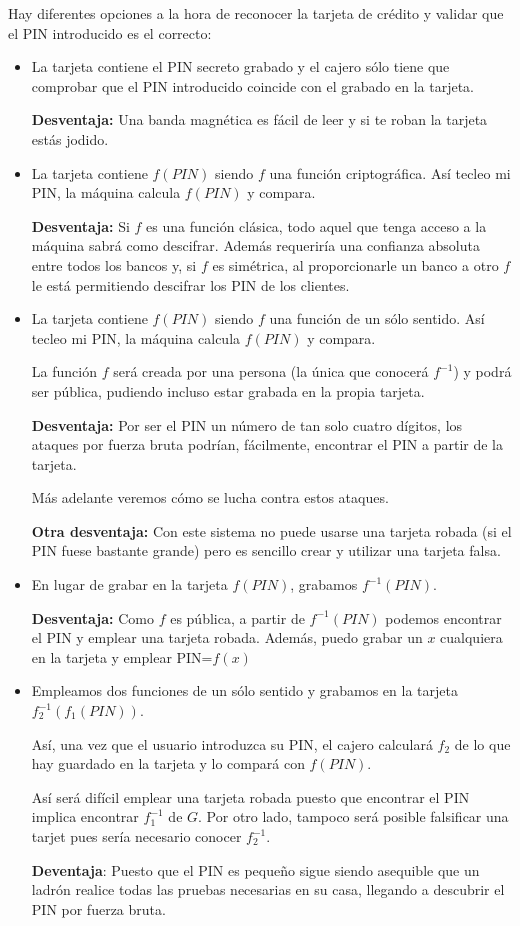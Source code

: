Hay diferentes opciones a la hora de reconocer la tarjeta de crédito y validar que el PIN introducido es el correcto:

\begin{itemize}
\item La tarjeta contiene el PIN secreto grabado y el cajero sólo tiene que comprobar que el PIN introducido coincide con el grabado en la tarjeta.

\textbf{Desventaja:} Una banda magnética es fácil de leer y si te roban la tarjeta estás jodido.

\item La tarjeta contiene $f(PIN)$ siendo $f$ una función criptográfica. Así tecleo mi PIN, la máquina calcula $f(PIN)$ y compara.

\textbf{Desventaja:} Si $f$ es una función clásica, todo aquel que tenga acceso a la máquina sabrá como descifrar. Además requeriría una confianza absoluta entre todos los bancos y, si $f$ es simétrica, al proporcionarle un banco a otro $f$ le está permitiendo descifrar los PIN de los clientes.

\item La tarjeta contiene $f(PIN)$ siendo $f$ una función de un sólo sentido. Así tecleo mi PIN, la máquina calcula $f(PIN)$ y compara.

La función $f$ será creada por una persona (la única que conocerá $f^{-1}$) y podrá ser pública, pudiendo incluso estar grabada en la propia tarjeta.

\textbf{Desventaja:} Por ser el PIN un número de tan solo cuatro dígitos, los ataques por fuerza bruta podrían, fácilmente, encontrar el PIN a partir de la tarjeta.

Más adelante veremos cómo se lucha contra estos ataques.

\textbf{Otra desventaja:} Con este sistema no puede usarse una tarjeta robada (si el PIN fuese bastante grande) pero es sencillo crear y utilizar una tarjeta falsa.

\item En lugar de grabar en la tarjeta $f(PIN)$, grabamos $f^{-1}(PIN)$.

\textbf{Desventaja:} Como $f$ es pública, a partir de $f^{-1}(PIN)$ podemos encontrar el PIN y emplear una tarjeta robada. Además, puedo grabar un $x$ cualquiera en la tarjeta y emplear PIN=$f(x)$

\item Empleamos dos funciones de un sólo sentido y grabamos en la tarjeta $f_2^{-1}(f_1(PIN))$.

Así, una vez que el usuario introduzca su PIN, el cajero calculará $f_2$ de lo que hay guardado en la tarjeta y lo compará con $f(PIN)$.

Así será difícil emplear una tarjeta robada puesto que encontrar el PIN implica encontrar $f_1^{-1}$ de $G$. Por otro lado, tampoco será posible falsificar una tarjet pues sería necesario conocer $f_2^{-1}$.

\textbf{Deventaja}: Puesto que el PIN es pequeño sigue siendo asequible que un ladrón realice todas las pruebas necesarias en su casa, llegando a descubrir el PIN por fuerza bruta.
\end{itemize}

